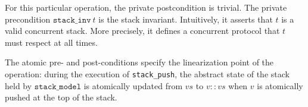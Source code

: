 For this particular operation, the private postcondition is trivial.
The private precondition $\mathtt{stack\_inv}\ t$ is the stack invariant.
Intuitively, it asserts that $t$ is a valid concurrent stack.
More precisely, it defines a concurrent protocol that $t$ must respect at all times.

The atomic pre- and post-conditions specify the linearization point of the operation: during the execution of \texttt{stack\_push}, the abstract state of the stack held by $\mathtt{stack\_model}$ is atomically updated from $\mathit{vs}$ to $\mathit{v} :: \mathit{vs}$ when $\mathit{v}$ is atomically pushed at the top of the stack.

